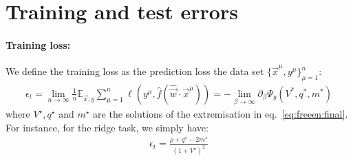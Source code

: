 \documentclass[11pt]{article}
\numberwithin{equation}{section}
\begin{document}

\section{Training and test errors}
\paragraph{Training loss: }
We define the training loss as the prediction loss the data set $\{\vec{x}^{\mu}, y^{\mu}\}_{\mu=1}^{n}$:
\begin{align}
\epsilon_{t} = \lim\limits_{n\to\infty}\frac{1}{n}\mathbb{E}_{\vec{x},y}\sum\limits_{\mu=1}^{n}\ell\left(y^{\mu},\hat{f}(\hat{\vec{w}}\cdot\vec{x}^{\mu})\right) = -\lim\limits_{\beta\to\infty}\partial_{\beta}\Psi_{y}(V^{*},q^{*},m^{*})
\end{align}
\noindent where $V^{\star}, q^{\star}$ and $m^{\star}$ are the solutions of the extremisation in eq.~\eqref{eq:freeen:final}. For instance, for the ridge task, we simply have:
\begin{align}
\epsilon_{t} = \frac{\rho+q^{\star}-2m^{\star}}{(1+V^{\star})^{2}}
\end{align}
\end{document}
